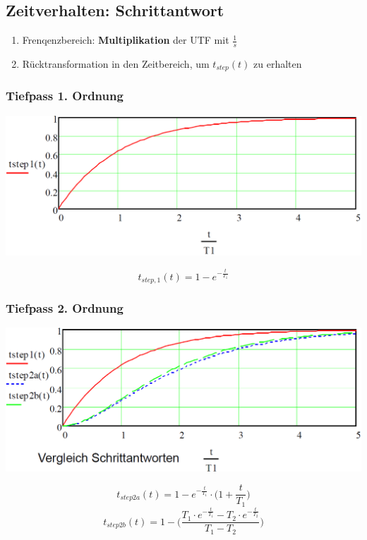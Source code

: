 \subsection{Zeitverhalten: Schrittantwort}

\begin{enumerate}
    \item Frenqenzbereich: \textbf{Multiplikation} der UTF mit $\frac{1}{s}$
    \item Rücktransformation in den Zeitbereich, um $t_{step}(t)$ zu erhalten
\end{enumerate}


\subsubsection{Tiefpass 1. Ordnung}

\begin{minipage}[c]{0.48\columnwidth}
    \includegraphics[width=\columnwidth]{images/schrittantwort_tp_ordnung_1.png}
\end{minipage}
\hfill
\begin{minipage}[c]{0.48\columnwidth}
    $$  t_{step,1}(t) = 1 - e^{- \frac{t}{T_1}} $$
\end{minipage}


\subsubsection{Tiefpass 2. Ordnung}

\begin{minipage}[c]{0.43\columnwidth}
    \includegraphics[width=\columnwidth]{images/schrittantworten_vergleich.png}
\end{minipage}
\hfill
\begin{minipage}[c]{0.55\columnwidth}
    $$ t_{step2a}(t) = 1 - e^{- \frac{t}{T_1}}\cdot \Big( 1 + \frac{t}{T_1} \Big) $$
    $$ t_{step2b}(t) = 1 - \Big( \frac{T_1 \cdot e^{- \frac{t}{T_1}} - T_2 \cdot e^{- \frac{t}{T_2}}}{T_1 - T_2} \Big) $$
\end{minipage}


